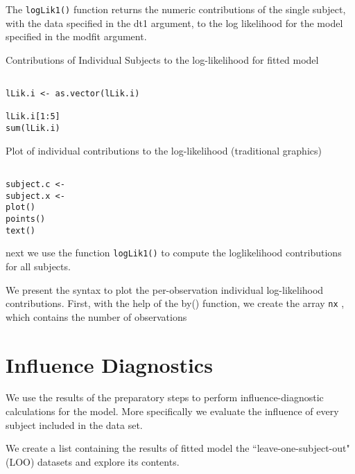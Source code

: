 \documentclass[a4paper,12pt]{article}
\begin{document}
The \texttt{logLik1()} function returns the numeric contributions of the single subject, with the data specified in the dt1 argument, to the log likelihood
for the model specified in the modfit argument.



Contributions of Individual Subjects to the log-likelihood for fitted model


\begin{framed}
\begin{verbatim}

lLik.i <- as.vector(lLik.i)

lLik.i[1:5]
sum(lLik.i)

\end{verbatim}
\end{framed}

Plot of individual contributions to the log-likelihood (traditional graphics)
\begin{framed}
\begin{verbatim}

subject.c <-
subject.x <- 
plot()
points()
text()
\end{verbatim}
\end{framed}

next we use the function \texttt{logLik1()} to compute the loglikelihood
contributions for all subjects.

We present the syntax to plot the per-observation individual log-likelihood contributions.
First, with the help of the by() function, we create the array \texttt{nx} , which contains the number
of observations


\section{Influence Diagnostics}

We use the results of the preparatory steps to perform influence-diagnostic calculations for the model.
More specifically we evaluate the influence of every subject included in the data set.


We create a list containing the results of fitted model the ``leave-one-subject-out" (LOO)
datasets and explore its contents.
\end{document}
